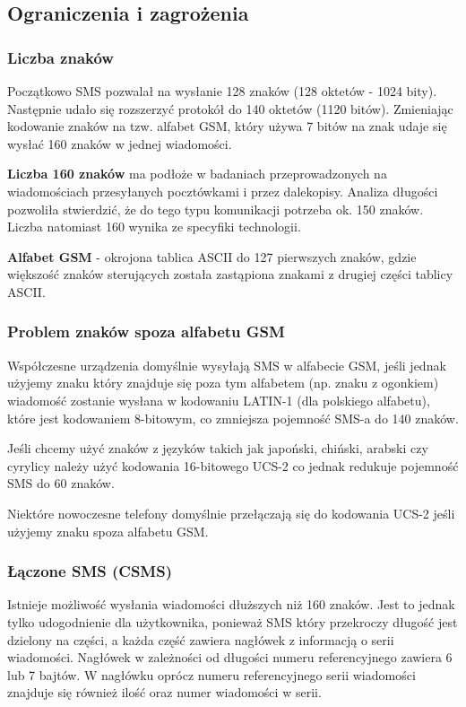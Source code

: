 \documentclass[xcolor=table]{beamer}
\begin{document}
\subsection{Ograniczenia i zagrożenia}
\begin{frame}[allowframebreaks]
  \frametitle{Liczba znaków}

  Początkowo SMS pozwalał na wysłanie 128 znaków (128 oktetów - 1024 bity).
  Następnie udało się rozszerzyć protokół do 140 oktetów (1120 bitów).
  Zmieniając kodowanie znaków na tzw. alfabet GSM, który używa 7 bitów na znak
  udaje się wysłać 160 znaków w jednej wiadomości.

  \textbf{Liczba 160 znaków} ma podłoże w badaniach przeprowadzonych na
  wiadomościach przesyłanych pocztówkami i przez dalekopisy. Analiza długości
  pozwoliła stwierdzić, że do tego typu komunikacji potrzeba ok. 150 znaków.
  Liczba natomiast 160 wynika ze specyfiki technologii.

  \framebreak

  \textbf{Alfabet GSM} - okrojona tablica ASCII do 127 pierwszych znaków, gdzie
  większość znaków sterujących została zastąpiona znakami z drugiej części
  tablicy ASCII.

\end{frame}
\begin{frame}
  \frametitle{Problem znaków spoza alfabetu GSM}

  Współczesne urządzenia domyślnie wysyłają SMS w alfabecie GSM, jeśli jednak
  użyjemy znaku który znajduje się poza tym alfabetem (np. znaku z ogonkiem)
  wiadomość zostanie wysłana w kodowaniu LATIN-1 (dla polskiego alfabetu), które
  jest kodowaniem 8-bitowym, co zmniejsza pojemność SMS-a do 140 znaków.

  Jeśli chcemy użyć znaków z języków takich jak japoński, chiński, arabski czy
  cyrylicy należy użyć kodowania 16-bitowego UCS-2 co jednak redukuje pojemność
  SMS do 60 znaków.

  Niektóre nowoczesne telefony domyślnie przełączają się do kodowania UCS-2
  jeśli użyjemy znaku spoza alfabetu GSM.
\end{frame}

\begin{frame}
  \frametitle{Łączone SMS (CSMS)}

  Istnieje możliwość wysłania wiadomości dłuższych niż 160 znaków. Jest to
  jednak tylko udogodnienie dla użytkownika, ponieważ SMS który przekroczy
  długość jest dzielony na części, a każda część zawiera nagłówek z informacją
  o serii wiadomości. Nagłówek w zależności od długości numeru referencyjnego
  zawiera 6 lub 7 bajtów. W nagłówku oprócz numeru referencyjnego serii
  wiadomości znajduje się również ilość oraz numer wiadomości w serii.

\end{frame}
\end{document}
